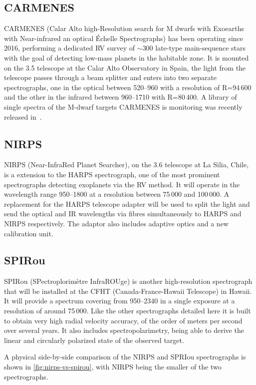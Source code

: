 \subsection{CARMENES}
\label{subsec:carmenes}
{CARMENES} (Calar Alto high-Resolution search for M dwarfs with Exoearths with Near-infrared an optical \'Echelle Spectrographs) has been operating since 2016, performing a dedicated {RV} survey of \(\sim\)300 late-type main-sequence stars with the goal of detecting low-mass planets in the habitable zone.
It is mounted on the 3.5\m{} telescope at the Calar Alto Observatory in Spain, the light from the telescope passes through a beam splitter and enters into two separate spectrographs, one in the optical between 520--960\nm{} with a resolution of R=94\,600 and the other in the infrared between 960--1710\nm{} with R=80\,400.
A library of single spectra of the {M-dwarf} targets {CARMENES} is monitoring was recently released in~\citet{reiners_carmenes_2018}.

\subsection{NIRPS}
\label{subsec:nirps}
{NIRPS} (Near-InfraRed Planet Searcher), on the 3.6\m{} telescope at La Silia, Chile, is a \nir{} extension to the {HARPS} spectrograph, one of the most prominent spectrographs detecting exoplanets via the {RV} method.
It will operate in the wavelength range 950--1800\nm{} at a resolution between 75\,000 and 100\,000.
A replacement for the {HARPS} telescope adapter will be used to split the light and send the optical and {IR} wavelengths via fibres simultaneously to {HARPS} and {NIRPS} respectively.
The adaptor also includes adaptive optics and a new calibration unit.

\subsection{SPIRou}
\label{subsec:spirou}
{SPIRou} (SPectroplorim\`etre InfraROUge) is another high-resolution \nir{} spectrograph that will be installed at the {CFHT} (Canada-France-Hawaii Telescope) in Hawaii.
It will provide a spectrum covering from 950--2340\nm{} in a single exposure at a resolution of around 75\,000.
Like the other spectrographs detailed here it is built to obtain very high radial velocity accuracy, of the order of meters per second over several years.
It also includes spectropolarimetry, being able to derive the linear and circularly polarized state of the observed target.

A physical side-by-side comparison of the {NIRPS} and {SPRIou} spectrographs is shown in \cref{fig:nirps-vs-spirou}, with {NIRPS} being the smaller of the two spectrographs.

